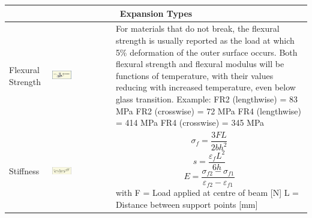 		
		\begin{table}[h!]
		\centering
		\begin{tabular}{|m{}|m{}|m{}|}
				\multicolumn{3}{c}{\textbf{Expansion Types}}
			\\
		\hline
				Flexural Strength
			& 
				 \begin{center}\includegraphics[width=0.35\textwidth]{images/FlexuralStrength.png}\end{center}  
			&
				For materials that do not break, the flexural strength is usually reported as the load at which 5\% deformation of the outer surface occurs. Both flexural strength and flexural modulus will be functions of temperature, with their values reducing with increased temperature, even below glass transition. \newline Example: \newline FR2 (lengthwise) = 83 MPa \newline FR2 (crosswise) = 72 MPa \newline FR4 (lengthwise) = 414 MPa \newline FR4 (crosswise) = 345 MPa
			\\
		\hline
				Stiffness
			& 
				 \begin{center}\includegraphics[width=0.35\textwidth]{images/Stiffness.png}\end{center}  
			&
				\begin{equation}
					\sigma_f = \frac{3FL}{2bh^2}
				\end{equation}
				\begin{equation}
					s = \frac{\varepsilon_f L^2}{6h}
				\end{equation}
				\begin{equation}
					E = \frac{\sigma_{f2}-\sigma_{f1}}{\varepsilon_{f2} - \varepsilon_{f1}}
				\end{equation}
				with\newline
				F = Load applied at centre of beam [N]\newline
				L = Distance between support points [mm]\newline

\end{tabular}
\end{table}
